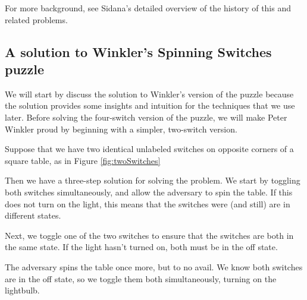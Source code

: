 For more background, see Sidana's \cite{Sidana2020} detailed overview of the
history of this and related problems.

\subsection{A solution to Winkler's Spinning Switches puzzle}

We will start by discuss the solution to Winkler's version of the puzzle because
the solution provides some insights and intuition for the techniques that we use
later. Before solving the four-switch version of the puzzle,
we will make Peter Winkler proud by beginning with a simpler, two-switch version.

\begin{example}
  Suppose that we have two identical unlabeled switches on opposite corners
  of a square table, as in Figure \ref{fig:twoSwitches}

  Then we have a three-step solution for solving the problem.
  We start by toggling both switches simultaneously, and allow the adversary
  to spin the table.
  If this does not turn on the light,
  this means that the switches were (and still) are in different states.

  Next, we toggle one of the two switches
  to ensure that the switches are both in the same state. If the light hasn't
  turned on, both must be in the off state.

  The adversary spins the table once more, but to no avail. We know both
  switches are in the off state, so we toggle them both simultaneously, turning
  on the lightbulb.
\end{example}

